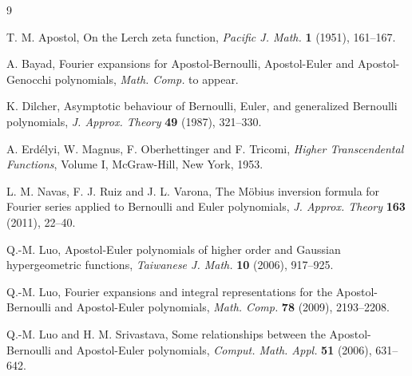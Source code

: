 \documentclass[11pt,a4paper]{amsart}
\theoremstyle{plain}
\theoremstyle{remark}
\begin{document}
\begin{thebibliography}{9}

T. M. Apostol,
On the Lerch zeta function,
\textit{Pacific J. Math.}
\textbf{1} (1951), 161--167.

A. Bayad, 
Fourier expansions for Apostol-Bernoulli, Apostol-Euler and Apostol-Genocchi polynomials,
\textit{Math. Comp.}
to appear.

K. Dilcher,
Asymptotic behaviour of Bernoulli, Euler, and generalized Bernoulli polynomials,
\textit{J. Approx. Theory}
\textbf{49} (1987), 321--330.

A. Erd\'{e}lyi, W. Magnus, F. Oberhettinger and F. Tricomi,
\textit{Higher Transcendental Functions}, Volume I,
McGraw-Hill, New York, 1953.

L. M. Navas, F. J. Ruiz and J. L. Varona,
The M\"obius inversion formula for Fourier series 
applied to Bernoulli and Euler polynomials,
\textit{J. Approx. Theory}
\textbf{163} (2011), 22--40.

Q.-M. Luo, %
Apostol-Euler polynomials of higher order and Gaussian hypergeometric functions, 
\textit{Taiwanese J. Math.} 
\textbf{10} (2006), 917--925.

Q.-M. Luo, %
Fourier expansions and integral representations for the Apostol-Bernoulli and Apostol-Euler polynomials,
\textit{Math. Comp.} 
\textbf{78} (2009), 2193--2208. 

Q.-M. Luo and H. M. Srivastava, 
Some relationships between the Apostol-Bernoulli and Apostol-Euler polynomials, 
\textit{Comput. Math. Appl.} 
\textbf{51} (2006), 631--642.

\end{thebibliography}




\end{document}
